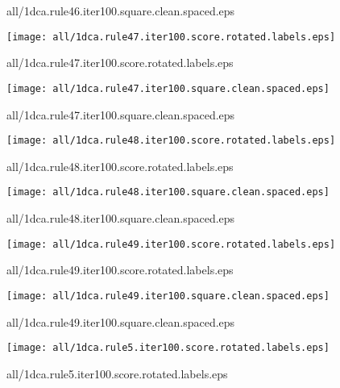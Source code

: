 \documentclass{article}
\begin{document}
{\footnotesize all/1dca.rule46.iter100.square.clean.spaced.eps}
\begin{center}
\begin{minipage}{\textwidth}
\texttt{[image: all/1dca.rule47.iter100.score.rotated.labels.eps]}
\end{minipage}
\end{center}
{\footnotesize all/1dca.rule47.iter100.score.rotated.labels.eps}
\begin{center}
\begin{minipage}{\textwidth}
\texttt{[image: all/1dca.rule47.iter100.square.clean.spaced.eps]}
\end{minipage}
\end{center}
{\footnotesize all/1dca.rule47.iter100.square.clean.spaced.eps}
\begin{center}
\begin{minipage}{\textwidth}
\texttt{[image: all/1dca.rule48.iter100.score.rotated.labels.eps]}
\end{minipage}
\end{center}
{\footnotesize all/1dca.rule48.iter100.score.rotated.labels.eps}
\begin{center}
\begin{minipage}{\textwidth}
\texttt{[image: all/1dca.rule48.iter100.square.clean.spaced.eps]}
\end{minipage}
\end{center}
{\footnotesize all/1dca.rule48.iter100.square.clean.spaced.eps}
\begin{center}
\begin{minipage}{\textwidth}
\texttt{[image: all/1dca.rule49.iter100.score.rotated.labels.eps]}
\end{minipage}
\end{center}
{\footnotesize all/1dca.rule49.iter100.score.rotated.labels.eps}
\begin{center}
\begin{minipage}{\textwidth}
\texttt{[image: all/1dca.rule49.iter100.square.clean.spaced.eps]}
\end{minipage}
\end{center}
{\footnotesize all/1dca.rule49.iter100.square.clean.spaced.eps}
\begin{center}
\begin{minipage}{\textwidth}
\texttt{[image: all/1dca.rule5.iter100.score.rotated.labels.eps]}
\end{minipage}
\end{center}
{\footnotesize all/1dca.rule5.iter100.score.rotated.labels.eps}
\end{document}
